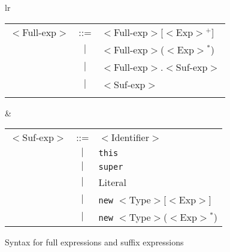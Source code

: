 \documentclass[a4paper]{llncs}
\newcommand{\FullExp}{\(<\)\textsf{Full-exp}\(>\)}
\newcommand{\SufExp}{\(<\)\textsf{Suf-exp}\(>\)}
\newcommand{\Exp}{\(<\)\textsf{Exp}\(>\)}
\newcommand{\Identifier}{\(<\)\textsf{Identifier}\(>\)}
\newcommand{\MethodCall}{\(<\)\textsf{Identifier}\(>\)(\Exp\ldots\Exp)}
\newcommand{\Static}{\(<\)\textsf{StaticClass}\(>\)}
\newcommand{\Type}{\(<\)\textsf{Type}\(>\)}
\newcommand{\option}{\(\:||\)}
\begin{document}

\begin{figure}[tb]
\begin{tabular}{lr}
\begin{tabular}[t]{rcl}
\FullExp & ::=  & \FullExp[\Exp\(^+\)]  \\
         &$\mid$& \FullExp(\Exp\(^*\))  \\
         &$\mid$& \FullExp.\SufExp  \\
         &$\mid$& \SufExp\\
\\
\end{tabular}
&
\hspace*{2em}
\begin{tabular}[t]{rcl}
\SufExp  & ::=  & \Identifier  \\
         &$\mid$& \texttt{this}  \\
         &$\mid$& \texttt{super}  \\
         &$\mid$& \textsf{Literal}\\
         &$\mid$& \texttt{new} \Type [\Exp]\\
         &$\mid$& \texttt{new} \Type (\Exp\(^*\))\\
\end{tabular}
\end{tabular}
\caption{Syntax for full expressions and suffix expressions}
\label{FigExpGrammar}
\end{figure}
\end{document}
